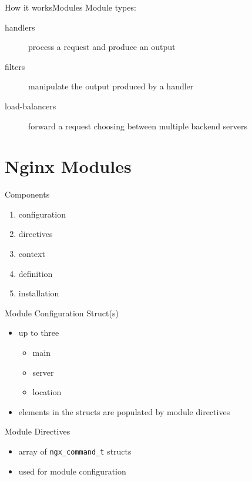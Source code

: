 \documentclass{beamer}
\begin{document}
\begin{frame}{How it works}{Modules}
Module types:
\begin{description}
 \item[handlers] process a request and produce an output
 \item[filters] manipulate the output produced by a handler
 \item[load-balancers] forward a request choosing between multiple backend servers
\end{description}
\end{frame}

\section{Nginx Modules}

\begin{frame}{Components}
 \begin{enumerate}
  \item configuration
  \item directives
  \item context
  \item definition
  \item installation
 \end{enumerate} 
\end{frame}

\begin{frame}{Module Configuration Struct(s)}
 \begin{itemize}
  \item up to three
  \begin{itemize}
   \item main
   \item server
   \item location
  \end{itemize}
  \item elements in the structs are populated by module directives
 \end{itemize}
\end{frame}

\begin{frame}[fragile]{Module Directives}
 \begin{itemize}
  \item array of \verb|ngx_command_t| structs
  \item used for module configuration
 \end{itemize}
\end{frame}
\end{document}
